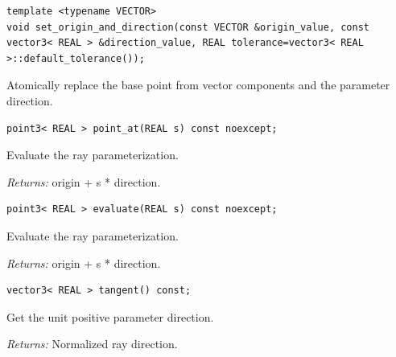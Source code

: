 \par\noindent\begin{minipage}{\linewidth}
\begin{lstlisting}[style=apireference]
template <typename VECTOR>
void set_origin_and_direction(const VECTOR &origin_value, const vector3< REAL > &direction_value, REAL tolerance=vector3< REAL >::default_tolerance());
\end{lstlisting}
{\footnotesize Atomically replace the base point from vector components and the parameter direction.\par}
\end{minipage}\par\vspace{1pt}
\par\noindent\begin{minipage}{\linewidth}
\begin{lstlisting}[style=apireference]
point3< REAL > point_at(REAL s) const noexcept;
\end{lstlisting}
{\footnotesize Evaluate the ray parameterization.\par}
{\footnotesize\textit{Returns:} origin + s * direction.\par}
\end{minipage}\par\vspace{1pt}
\par\noindent\begin{minipage}{\linewidth}
\begin{lstlisting}[style=apireference]
point3< REAL > evaluate(REAL s) const noexcept;
\end{lstlisting}
{\footnotesize Evaluate the ray parameterization.\par}
{\footnotesize\textit{Returns:} origin + s * direction.\par}
\end{minipage}\par\vspace{1pt}
\par\noindent\begin{minipage}{\linewidth}
\begin{lstlisting}[style=apireference]
vector3< REAL > tangent() const;
\end{lstlisting}
{\footnotesize Get the unit positive parameter direction.\par}
{\footnotesize\textit{Returns:} Normalized ray direction.\par}
\end{minipage}\par\vspace{1pt}

